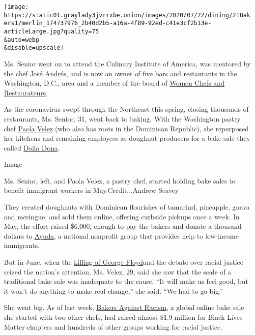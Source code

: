 \texttt{[image: https://static01.graylady3jvrrxbe.onion/images/2020/07/22/dining/21Bakers1/merlin\_174737976\_2b40d2b5-a16a-4f89-92ed-c41e3cf2b13e-articleLarge.jpg?quality=75\\\&auto=webp\\\&disable=upscale]}

Ms. Senior went on to attend the Culinary Institute of America, was
mentored by the chef
\href{https://www.nytimes3xbfgragh.onion/2017/10/30/dining/jose-andres-puerto-rico.html}{José
Andrés}, and is now an owner of five
\href{https://lacosechadc.com/merchants/serenata/}{bars} and
\href{https://www.coladashop.com/}{restaurants} in the Washington, D.C.,
area and a member of the board of \href{https://womenchefs.org/}{Women
Chefs and Restaurateurs}.

As the coronavirus swept through the Northeast this spring, closing
thousands of restaurants, Ms. Senior, 31, went back to baking. With the
Washington pastry chef
\href{https://www.instagram.com/smallorchids/?hl=en}{Paola Velez} (who
also has roots in the Dominican Republic), she repurposed her kitchens
and remaining employees as doughnut producers for a bake sale they
called \href{https://www.instagram.com/donadonadc/}{Doña Dona}.

Image

Ms. Senior, left, and Paola Velez, a pastry chef, started holding bake
sales to benefit immigrant workers in May.Credit...Andrew Seavey

They created doughnuts with Dominican flourishes of tamarind, pineapple,
guava and meringue, and sold them online, offering curbside pickups once
a week. In May, the effort raised \$6,000, enough to pay the bakers and
donate a thousand dollars to \href{https://www.ayuda.com/}{Ayuda}, a
national nonprofit group that provides help to low-income immigrants.

But in June, when the
\href{https://www.nytimes3xbfgragh.onion/2020/05/31/us/george-floyd-investigation.html}{killing
of George Floyd}and the debate over racial justice seized the nation's
attention, Ms. Velez, 29, said she saw that the scale of a traditional
bake sale was inadequate to the cause. ``It will make us feel good, but
it won't do anything to make real change,'' she said. ``We had to go
big.''

She went big. As of last week,
\href{https://www.bakersagainstracism.com/}{Bakers Against Racism}, a
global online bake sale she started with two other chefs, had raised
almost \$1.9 million for Black Lives Matter chapters and hundreds of
other groups working for racial justice.

